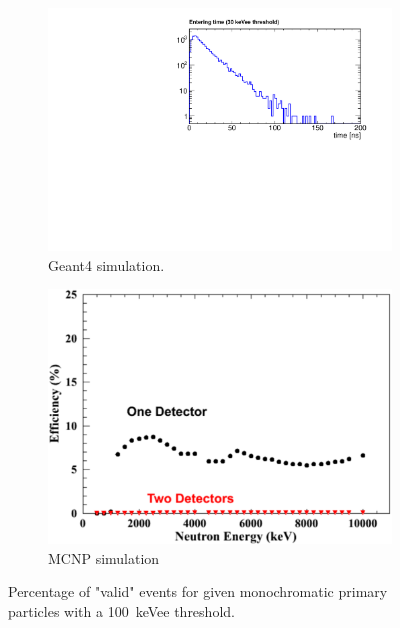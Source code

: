 \documentclass[12pt]{article}
\begin{document}
  \begin{figure}[H]
  	\begin{subfigure}[t]{0.49\textwidth}
  		\includegraphics[trim = 0cm 0cm 0cm 1.15cm, clip,width=\textwidth]{pics/timing.pdf}
  		\caption{Geant4 simulation.}
  	\end{subfigure}
  	\begin{subfigure}[t]{0.49\textwidth}
  		\includegraphics[trim = 0cm 0cm 0cm 1.15cm, clip, width=\textwidth]{pics/efficiency_MCNP100.pdf}
  		\caption{MCNP simulation}
  	\end{subfigure}
  	\caption{Percentage of "valid" events for given monochromatic primary particles with a \SI{100}{keVee} threshold.}
  	\label{fig:efficiency100}
  \end{figure}
  
\end{document}
